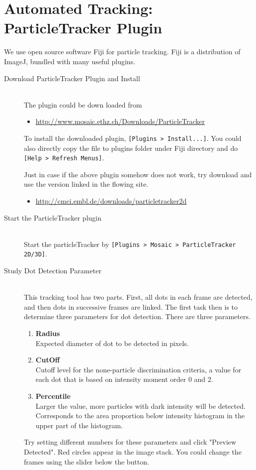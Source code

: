 \documentclass[11pnt]{article}
\begin{document}
\section{Automated Tracking: ParticleTracker Plugin}

We use open source software Fiji for particle tracking. Fiji is a distribution of ImageJ, bundled with many useful plugins. 

\begin{description}

\item[Download ParticleTracker Plugin and Install]\hfill\\

The plugin could be down loaded from
\begin{itemize}
\item \url{http://www.mosaic.ethz.ch/Downloads/ParticleTracker}
\end{itemize}
To install the downloaded plugin, \verb"[Plugins > Install...]". You could also directly copy the file to plugins folder under Fiji directory and do \verb"[Help > Refresh Menus]".

Just in case if the above plugin somehow does not work, try download and use the version linked in the flowing site. 

\begin{itemize}
\item \url{http://cmci.embl.de/downloads/particletracker2d}
\end{itemize}

\item[Start the ParticleTracker plugin]\hfill\\

Start the particleTracker by \verb"[Plugins > Mosaic > ParticleTracker 2D/3D]". 

\item[Study Dot Detection Parameter]\hfill\\

This tracking tool has two parts. First, all dots in each frame are detected, and then dots in successive frames are linked. The first task then is to determine three parameters for dot detection. There are three parameters. 
\begin{enumerate}
\item \textbf{Radius}\hfill\\
Expected diameter of dot to be detected in pixels. 
\item \textbf{CutOff}\hfill\\
Cutoff level for the none-particle discrimination criteria, a value for each dot that is based on intensity moment order 0 and 2. 
\item \textbf{Percentile}\hfill\\
Larger the value, more particles with dark intensity will be detected. Corresponds to the area proportion below intensity histogram in the upper part of the histogram. 
\end{enumerate}
Try setting different numbers for these parameters and click "Preview Detected". Red circles appear in the image stack. You could change the frames using the slider below the button. 


\end{description}
\end{document}
